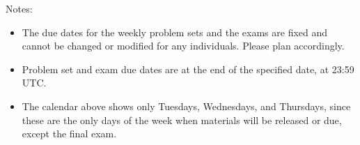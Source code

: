 \documentclass[pdftex, brazil, 12pt, twoside]{article}
\begin{document}
\begin{figure}[H]
  \begin{center}
    \label{fig:calendar}
  \end{center}
\end{figure}

Notes:

\begin{itemize}[noitemsep]
\item The due dates for the weekly problem sets and the exams are fixed and cannot
  be changed or modified for any individuals. Please plan accordingly.
\item Problem set and exam due dates are at the end of the specified date, at 23:59 UTC.
\item The calendar above shows only Tuesdays, Wednesdays, and Thursdays, since these
  are the only days of the week when materials will be released or due, except
  the final exam.
\end{itemize}
\end{document}
